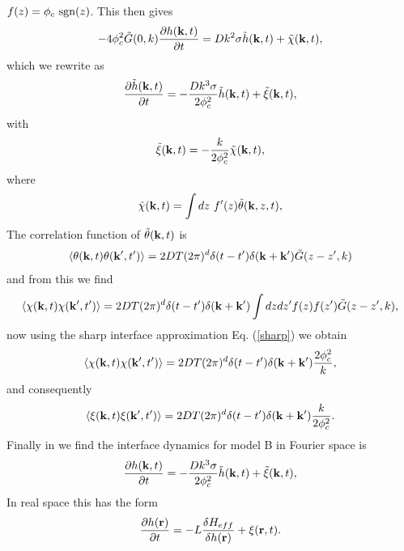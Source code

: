 $f(z) = \phi_c\  {\rm sgn}(z)$. This then gives
\begin{equation}
-4\phi_c^2 \tilde G(0,k) \frac{\partial h({\bf k},t)}{\partial t} = 
Dk^2\sigma  \tilde h({\bf k},t) + \tilde \chi({\bf k},t),
\end{equation}
which we rewrite as
\begin{equation}
\frac{\partial \tilde h({\bf k},t)}{\partial t} = -\frac{Dk^3\sigma}{2\phi_c^2} \tilde h({\bf k},t) + \tilde \xi({\bf k},t),
\end{equation}
with 
\begin{equation}
\tilde \xi({\bf k},t)= - \frac{k}{2\phi_c^2}\tilde \chi({\bf k},t),
\end{equation}
where 
\begin{equation}
\tilde \chi({\bf k},t)= \int dz\  f'(z) \tilde\theta({\bf k},z,t),
\end{equation}
The correlation function of $\tilde \theta({\bf k},t)$ is 
\begin{equation}
\langle \theta({\bf k},t)\theta({\bf k}',t')\rangle = 2DT(2\pi)^d \delta(t-t') \delta({\bf k}+{\bf k'}) \tilde G(z-z',k)
\end{equation}
and from this we find 
\begin{equation}
\langle \chi({\bf k},t)\chi({\bf k}',t')\rangle  = 2DT(2\pi)^d \delta(t-t') \delta({\bf k}+{\bf k'}) \int dz dz'
f(z) f(z') \tilde G(z-z',k),\label{bstep2}
\end{equation}
now using the sharp interface approximation Eq. (\ref{sharp}) we obtain
\begin{equation}
\langle \chi({\bf k},t)\chi({\bf k}',t')\rangle  = 2DT(2\pi)^d \delta(t-t') \delta({\bf k}+{\bf k'}) \frac{2\phi_c^2}{k},
\end{equation}
and consequently
\begin{equation}
\langle \xi({\bf k},t)\xi({\bf k}',t')\rangle = 2DT(2\pi)^d \delta(t-t') \delta({\bf k}+{\bf k'}) \frac{k}{2\phi_c^2}.
\end{equation}
Finally in we find the interface dynamics for model B in Fourier space is
\begin{equation}
\frac{\partial h({\bf k},t)}{\partial t} = -\frac{Dk^3\sigma}{2\phi_c^2} \tilde h({\bf k},t) + \tilde \xi({\bf k},t),\label{modBFT}
\end{equation}
In real space this has the form
\begin{equation}
\frac{\partial h({\bf r})}{\partial t}= -L \frac{\delta H_{eff}}{\delta h ({\bf r})} + \xi({\bf r},t).
\end{equation}
